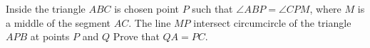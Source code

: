 \problem{}
Inside the triangle $ABC$ is chosen point $P$ such that $\angle ABP = \angle CPM$, where $M$ is a middle of the segment $AC$.
The line $MP$ intersect circumcircle of the triangle $APB$ at points $P$ and $Q$
Prove that $QA = PC$.
\solution
\endproblem
